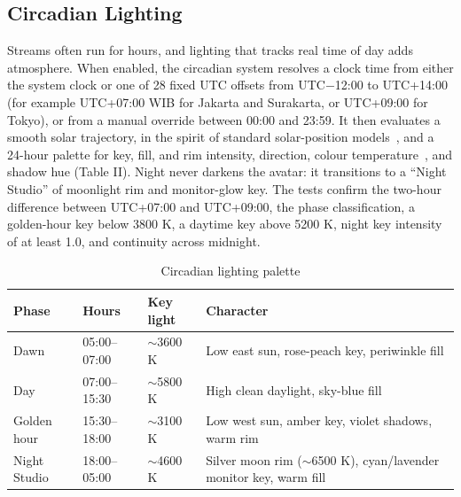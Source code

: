 \documentclass[conference]{IEEEtran}
\begin{document}
\subsection{Circadian Lighting}
Streams often run for hours, and lighting that tracks real time of day adds atmosphere. When enabled, the circadian system resolves a clock time from either the system clock or one of 28 fixed UTC offsets from UTC$-$12:00 to UTC+14:00 (for example UTC+07:00 WIB for Jakarta and Surakarta, or UTC+09:00 for Tokyo), or from a manual override between 00:00 and 23:59. It then evaluates a smooth solar trajectory, in the spirit of standard solar-position models~\cite{reda}, and a 24-hour palette for key, fill, and rim intensity, direction, colour temperature~\cite{mccamy}, and shadow hue (Table II). Night never darkens the avatar: it transitions to a ``Night Studio'' of moonlight rim and monitor-glow key. The tests confirm the two-hour difference between UTC+07:00 and UTC+09:00, the phase classification, a golden-hour key below 3800 K, a daytime key above 5200 K, night key intensity of at least 1.0, and continuity across midnight.

\begin{table}[!t]
\renewcommand{\arraystretch}{1.15}
\caption{Circadian lighting palette}
\label{tab:circadian}
\centering\footnotesize
\begin{tabular}{p{}p{}p{}p{}}
\hline
\textbf{Phase} & \textbf{Hours} & \textbf{Key light} & \textbf{Character} \\
\hline
Dawn & 05:00--07:00 & $\sim$3600 K & Low east sun, rose-peach key, periwinkle fill \\
Day & 07:00--15:30 & $\sim$5800 K & High clean daylight, sky-blue fill \\
Golden hour & 15:30--18:00 & $\sim$3100 K & Low west sun, amber key, violet shadows, warm rim \\
Night Studio & 18:00--05:00 & $\sim$4600 K & Silver moon rim ($\sim$6500 K), cyan/lavender monitor key, warm fill \\
\hline
\end{tabular}
\end{table}
\end{document}
